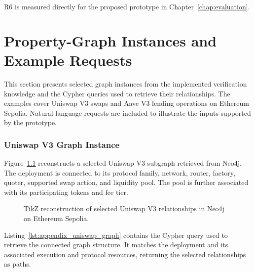 R6 is measured directly for the proposed
prototype in Chapter~\ref{chap:evaluation}.


\chapter{Property-Graph Instances and Example Requests}
\label{app:graph_instances}

This section presents selected graph instances from the
implemented verification knowledge and the Cypher queries
used to retrieve their relationships. The examples cover
Uniswap V3 swaps and Aave V3 lending operations on
Ethereum Sepolia. Natural-language requests are included
to illustrate the inputs supported by the prototype.



\subsection{Uniswap V3 Graph Instance}

Figure~\ref{fig:appendix_uniswap_neo4j} reconstructs a
selected Uniswap V3 subgraph retrieved from Neo4j.
The deployment is connected to its protocol family,
network, router, factory, quoter, supported swap action,
and liquidity pool. The pool is further associated
with its participating tokens and fee tier.

\begin{figure}[H]
    \centering
    \resizebox{\linewidth}{!}{%
    }
    \caption{TikZ reconstruction of selected Uniswap V3
    relationships in Neo4j on Ethereum Sepolia.}
    \label{fig:appendix_uniswap_neo4j}
\end{figure}

Listing~\ref{lst:appendix_uniswap_graph} contains the
Cypher query used to retrieve the connected graph
structure. It matches the deployment and its associated
execution and protocol resources, returning the selected
relationships as paths.

